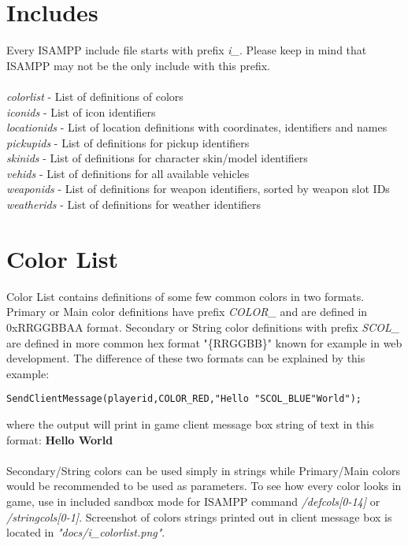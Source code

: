\documentclass{article}
\begin{document}
\newpage
\section{Includes}
Every ISAMPP include file starts with prefix \textit{i\_}. Please keep in mind that ISAMPP may not be the only include with this prefix.
\\
\\
\textit{colorlist} - List of definitions of colors
\\
\textit{iconids} - List of icon identifiers
\\
\textit{locationids} - List of location definitions with coordinates, identifiers and names
\\
\textit{pickupids} - List of definitions for pickup identifiers
\\
\textit{skinids} - List of definitions for character skin/model identifiers
\\
\textit{vehids} - List of definitions for all available vehicles
\\
\textit{weaponids} - List of definitions for weapon identifiers, sorted by weapon slot IDs
\\
\textit{weatherids} - List of definitions for weather identifiers


\newpage
\section{Color List}
Color List contains definitions of some few common colors in two formats. Primary or Main color definitions have prefix \textit{COLOR\_} and are defined in 0xRRGGBBAA format. Secondary or String color definitions with prefix \textit{SCOL\_} are defined in more common hex format "\{RRGGBB\}" known for example in web development. The difference of these two formats can be explained by this example:
\begin{verbatim}
SendClientMessage(playerid,COLOR_RED,"Hello "SCOL_BLUE"World");
\end{verbatim}
where the output will print in game client message box string of text in this format:
\textbf{\color{red}Hello \color{blue}World}\\
\\
Secondary/String colors can be used simply in strings while Primary/Main colors would be recommended to be used as parameters. To see how every color looks in game, use in included sandbox mode for ISAMPP command \textit{/defcols[0-14]} or \textit{/stringcols[0-1]}. Screenshot of colors strings printed out in client message box is located in \textit{"docs/i\_colorlist.png"}.
\end{document}
